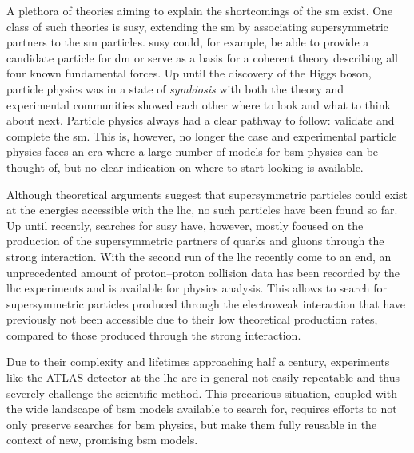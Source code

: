 A plethora of theories aiming to explain the shortcomings of the \gls{sm} exist. One class of such theories is \gls{susy}, extending the \gls{sm} by associating supersymmetric partners to the \gls{sm} particles.
\gls{susy} could, for example, be able to provide a candidate particle for \gls{dm} or serve as a basis for a coherent theory describing all four known fundamental forces.
Up until the discovery of the Higgs boson, particle physics was in a state of \textit{symbiosis} with both the theory and experimental communities showed each other where to look and what to think about next.
Particle physics always had a clear pathway to follow: validate and complete the \gls{sm}. This is, however, no longer the case and experimental particle physics faces an era where a large number of models for \gls{bsm} physics can be thought of, but no clear indication on where to start looking is available. 

Although theoretical arguments suggest that supersymmetric particles could exist at the energies accessible with the \gls{lhc}, no such particles have been found so far.
Up until recently, searches for \gls{susy} have, however, mostly focused on the production of the supersymmetric partners of quarks and gluons through the strong interaction.
With the second run of the \gls{lhc} recently come to an end, an unprecedented amount of proton--proton collision data has been recorded by the \gls{lhc} experiments and is available for physics analysis.
This allows to search for supersymmetric particles produced through the electroweak interaction that have previously not been accessible due to their low theoretical production rates, compared to those produced through the strong interaction.

Due to their complexity and lifetimes approaching half a century, experiments like the ATLAS detector at the \gls{lhc} are in general not easily repeatable and thus severely challenge the scientific method. This precarious situation, coupled with the wide landscape of \gls{bsm} models available to search for, requires efforts to not only preserve searches for \gls{bsm} physics, but make them fully reusable in the context of new, promising \gls{bsm} models. 

